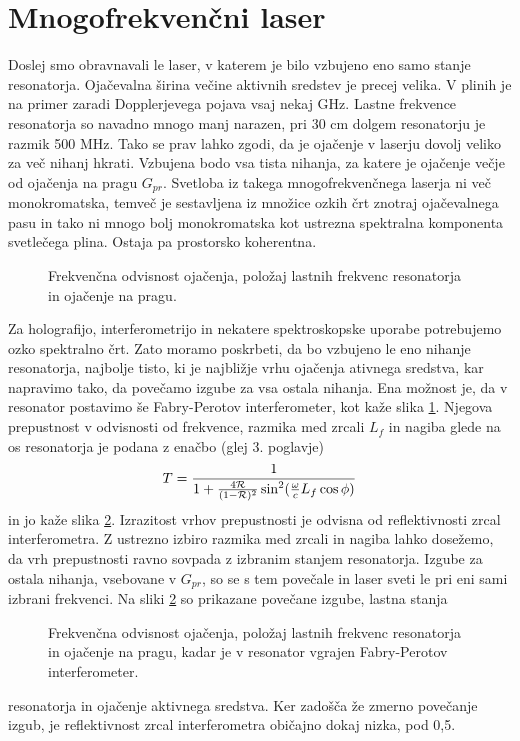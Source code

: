 \section{Mnogofrekvenčni laser}

Doslej smo obravnavali le laser, v katerem je bilo vzbujeno eno samo stanje
resonatorja. Ojačevalna širina večine aktivnih sredstev je precej
velika. V plinih je na primer zaradi Dopplerjevega pojava vsaj nekaj GHz.
Lastne frekvence resonatorja so navadno mnogo manj narazen, pri 30 cm dolgem
resonatorju je razmik 500 MHz. Tako se prav lahko zgodi, da je ojačenje v
laserju dovolj veliko za več nihanj hkrati. Vzbujena bodo vsa tista
nihanja, za katere je ojačenje večje od ojačenja na pragu $G_{pr}$.
Svetloba iz takega mnogofrekvenčnega laserja ni več monokromatska,
temveč je sestavljena iz množice ozkih črt znotraj ojačevalnega pasu
in tako ni mnogo bolj monokromatska kot ustrezna spektralna komponenta
svetlečega plina. Ostaja pa prostorsko koherentna.

\begin{figure}[tbp]
\label{s5.6} \vskip 5cm
\caption{ Frekvenčna odvisnost ojačenja, položaj lastnih frekvenc
resonatorja in ojačenje na pragu.}
\end{figure}

Za holografijo, interferometrijo in nekatere spektroskopske uporabe
potrebujemo ozko spektralno črt. Zato moramo poskrbeti, da bo vzbujeno le
eno nihanje resonatorja, najbolje tisto, ki je najbližje vrhu ojačenja
ativnega sredstva, kar napravimo tako, da povečamo izgube za vsa ostala
nihanja. Ena možnost je, da v resonator postavimo še Fabry-Perotov
interferometer, kot kaže slika \ref{s5.6}. Njegova prepustnost v
odvisnosti od frekvence, razmika med zrcali $L_{f}$ in nagiba glede na os
resonatorja je podana z enačbo (glej 3. poglavje) 
\begin{equation}
T=\frac{1}{1+\frac{4{\cal {R}}}{(1-{\cal {R}})^{2}}\sin ^{2}(\frac{\omega }{c%
}L_{f}\cos \phi )}  \label{5.22}
\end{equation}
in jo kaže slika \ref{s5.7}. Izrazitost vrhov prepustnosti je odvisna od
reflektivnosti zrcal interferometra. Z ustrezno izbiro razmika med zrcali in
nagiba lahko dosežemo, da vrh prepustnosti ravno sovpada z izbranim
stanjem resonatorja. Izgube za ostala nihanja, vsebovane v $G_{pr}$, so se s
tem povečale in laser sveti le pri eni sami izbrani frekvenci. Na sliki 
\ref{s5.7} so prikazane povečane izgube, lastna stanja 
\begin{figure}[tbp]
\label{s5.7} \vskip 7cm
\caption{Frekvenčna odvisnost ojačenja, položaj lastnih frekvenc
resonatorja in ojačenje na pragu, kadar je v resonator vgrajen
Fabry-Perotov interferometer.}
\end{figure}
resonatorja in ojačenje aktivnega sredstva. Ker zadošča že zmerno
povečanje izgub, je reflektivnost zrcal interferometra običajno dokaj
nizka, pod 0,5.

